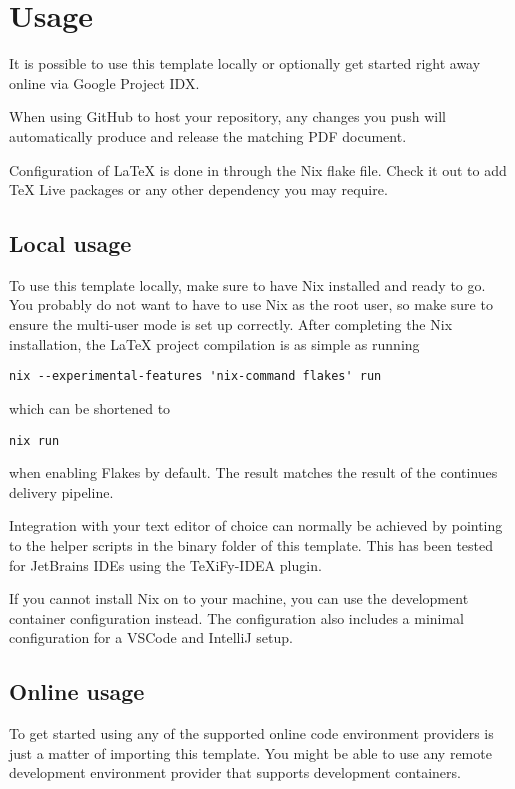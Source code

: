 \section{Usage}\label{sec:usage}

It is possible to use this template locally or optionally get started right away online via Google Project
IDX\parencite{noauthor_project_nodate}.

When using GitHub to host your repository, any changes you push will automatically produce and release the matching PDF
document.

Configuration of LaTeX is done in through the Nix flake file.
Check it out to add TeX Live packages or any other dependency you may require.

\subsection{Local usage}\label{subsec:local-usage}

To use this template locally, make sure to have Nix\parencite{noauthor_download_nodate} installed and ready to go.
You probably do not want to have to use Nix as the root user, so make sure to ensure the multi-user mode is set up
correctly\parencite{noauthor_multi-user_nodate}.
After completing the Nix installation, the LaTeX project compilation is as simple as running

\begin{verbatim}
nix --experimental-features 'nix-command flakes' run
\end{verbatim}

which can be shortened to

\begin{verbatim}
nix run
\end{verbatim}

when enabling Flakes by default\parencite{noauthor_flakes_nodate}.
The result matches the result of the continues delivery pipeline.

Integration with your text editor of choice can normally be achieved by pointing to the helper scripts in the binary
folder of this template.
This has been tested for JetBrains IDEs using the TeXiFy-IDEA plugin\parencite{noauthor_hannah-stentexify-idea_2025}.

If you cannot install Nix on to your machine, you can use the development
container\parencite{noauthor_development_nodate} configuration instead.
The configuration also includes a minimal configuration for a VSCode and IntelliJ setup.

\subsection{Online usage}\label{subsec:online-usage}

To get started using any of the supported online code environment providers is just a matter of importing this template.
You might be able to use any remote development environment provider that supports development containers.
